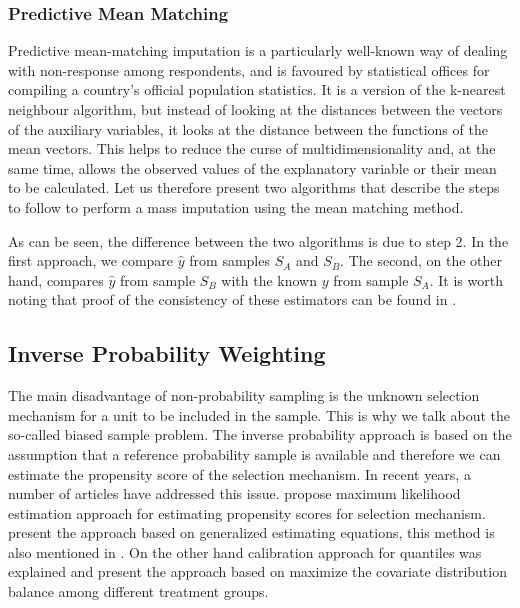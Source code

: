 \documentclass[
]{jss}
\begin{document}
\subsubsection{Predictive Mean Matching}\label{predictive-mean-matching}

Predictive mean-matching imputation is a particularly well-known way of
dealing with non-response among respondents, and is favoured by
statistical offices for compiling a country's official population
statistics. It is a version of the k-nearest neighbour algorithm, but
instead of looking at the distances between the vectors of the auxiliary
variables, it looks at the distance between the functions of the mean
vectors. This helps to reduce the curse of multidimensionality and, at
the same time, allows the observed values of the explanatory variable or
their mean to be calculated. Let us therefore present two algorithms
that describe the steps to follow to perform a mass imputation using the
mean matching method.

As can be seen, the difference between the two algorithms is due to step
2. In the first approach, we compare \(\hat{y}\) from samples \(S_A\)
and \(S_B\). The second, on the other hand, compares \(\hat{y}\) from
sample \(S_B\) with the known \(y\) from sample \(S_A\). It is worth
noting that proof of the consistency of these estimators can be found in
\citet{Beres}.

\subsection{Inverse Probability Weighting}\label{sec-ipw}

The main disadvantage of non-probability sampling is the unknown
selection mechanism for a unit to be included in the sample. This is why
we talk about the so-called biased sample problem. The inverse
probability approach is based on the assumption that a reference
probability sample is available and therefore we can estimate the
propensity score of the selection mechanism. In recent years, a number
of articles have addressed this issue. \cite{chen2020doubly} propose
maximum likelihood estimation approach for estimating propensity scores
for selection mechanism. \cite{wu2022statistical} present the approach
based on generalized estimating equations, this method is also mentioned
in \cite{yang_doubly_2020}. On the other hand calibration approach for
quantiles was explained \cite{beresewicz2024inference} and
\cite{santanna_covariate_2022} present the approach based on maximize
the covariate distribution balance among different treatment groups.
\end{document}
